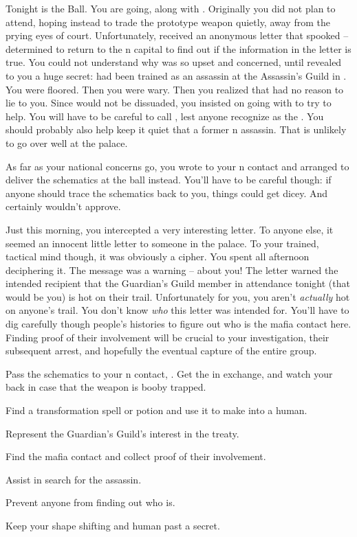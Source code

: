 \documentclass[char]{NeptuneBall}
\begin{document}
Tonight is the \cExExKing{} Ball. You are going, along with \cQueen{}. Originally you did not plan to attend, hoping instead to trade  the prototype weapon quietly, away from the prying eyes of court. Unfortunately, \cQueen{} received an anonymous letter that spooked \cQueen{\them} -- \cQueen{\they} \cQueen{\are} determined to return to the \pAtlantis{}n capital to find out if the information in the letter is true. You could not understand why \cQueen{} was so upset and concerned, until \cQueen{\they} revealed to you a huge secret: \cQueen{} had been trained as an assassin at the Assassin's Guild in \pPacifica{}. You were floored. Then you were wary. Then you realized that \cQueen{} had no reason to lie to you. Since \cQueen{\they} would not be dissuaded, you insisted on going with \cQueen{\them} to try to help. You will have to be careful to call \cQueen{\them} \cQueen{\MYname}, lest anyone recognize \cQueen{\them} as the \cQueen{\King}. You should probably also help keep it quiet that \cQueen{\they} \cQueen{\are} a former \pPacifica{}n assassin. That is unlikely to go over well at the palace.

As far as your national concerns go, you wrote to your \pPacifica{}n contact and arranged to deliver the schematics at the ball instead. You'll have to be careful though: if anyone should trace the schematics back to you, things could get dicey. And \cQueen{} certainly wouldn't approve.

Just this morning, you intercepted a very interesting letter. To anyone else, it seemed an innocent little letter to someone in the palace. To your trained, tactical mind though, it was obviously a cipher. You spent all afternoon deciphering it. The message was a warning -- about you! The letter warned the intended recipient that the Guardian's Guild member in attendance tonight (that would be you) is hot on their trail. Unfortunately for you, you aren't \emph{actually} hot on anyone's trail. You don't know \emph{who} this letter was intended for. You'll have to dig carefully though people's histories to figure out who is the mafia contact here. Finding proof of their involvement will be crucial to your investigation, their subsequent arrest, and hopefully the eventual capture of the entire group.

\begin{itemz}[Goals]
  \item Pass the schematics to your \pPacifica{}n contact, \cSpy{}. Get the \iBattlePlan{} in exchange, and watch your back in case \cSpy{\they}  that the weapon is booby trapped.
  \item Find a transformation spell or potion and use it to make \cQueen{} into a human.
  \item Represent the Guardian's Guild's interest in the treaty.
  \item Find the mafia contact and collect proof of their involvement.
  \item Assist \cQueen{} in \cQueen{\their} search for the assassin.
  \item Prevent anyone from finding out who \cQueen{} is.
  \item Keep your shape shifting and human past a secret.
\end{itemz}
\end{document}
